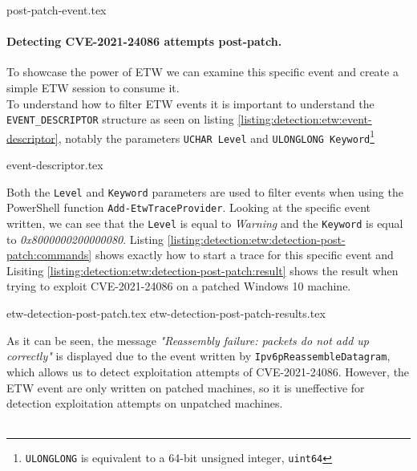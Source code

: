 \documentclass{report}
\begin{document}
{post-patch-event.tex}

\paragraph{Detecting CVE-2021-24086 attempts post-patch.}
To showcase the power of \gls{ETW} we can examine this specific event and create a simple \gls{ETW} session to consume it.
\\
To understand how to filter \gls{ETW} events it is important to understand the \texttt{EVENT_DESCRIPTOR} structure as seen on listing \ref{listing:detection:etw:event-descriptor}, notably the parameters \texttt{UCHAR Level} and \texttt{ULONGLONG Keyword}\footnote{\texttt{ULONGLONG} is equivalent to a 64-bit unsigned integer, \texttt{uint64}}

{event-descriptor.tex}

Both the \texttt{Level} and \texttt{Keyword} parameters are used to filter events when using the PowerShell function \texttt{Add-EtwTraceProvider}. Looking at the specific event written, we can see that the \texttt{Level} is equal to \emph{Warning}\cite{url:etw:etw-event-descriptor} and the \texttt{Keyword} is equal to \emph{0x8000000200000080}. Listing \ref{listing:detection:etw:detection-post-patch:commands} shows exactly how to start a trace for this specific event and Lisiting \ref{listing:detection:etw:detection-post-patch:result} shows the result when trying to exploit CVE-2021-24086 on a patched Windows 10 machine.

{etw-detection-post-patch.tex}
{etw-detection-post-patch-results.tex}

As it can be seen, the message \emph{"Reassembly failure: packets do not add up correctly"} is displayed due to the event written by \texttt{Ipv6pReassembleDatagram}, which allows us to detect exploitation attempts of CVE-2021-24086. However, the \gls{ETW} event are only written on patched machines, so it is uneffective for detection exploitation attempts on unpatched machines.
\\
\\
\end{document}
